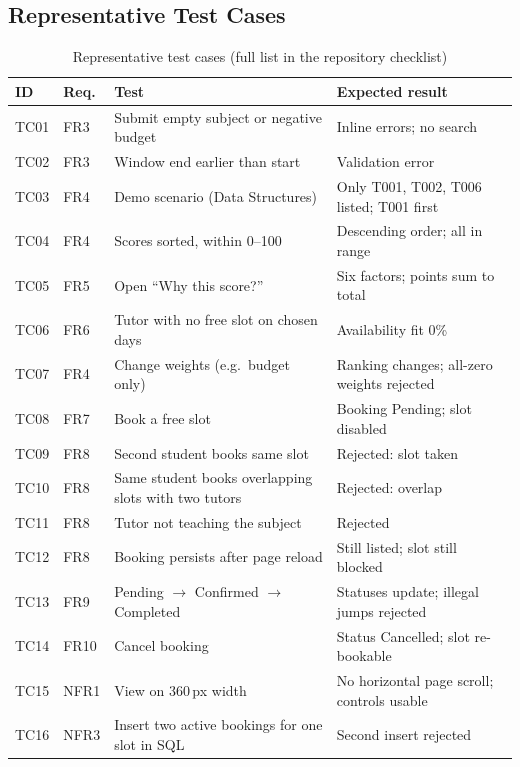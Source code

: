 \documentclass[11pt,a4paper]{article}
\begin{document}
\subsection{Representative Test Cases}
\begin{table}[H]
\centering
\caption{Representative test cases (full list in the repository checklist)}
\small
\begin{tabularx}{\linewidth}{@{}l l X X@{}}
\toprule
\textbf{ID} & \textbf{Req.} & \textbf{Test} & \textbf{Expected result}\\ \midrule
TC01 & FR3 & Submit empty subject or negative budget & Inline errors; no search\\
TC02 & FR3 & Window end earlier than start & Validation error\\
TC03 & FR4 & Demo scenario (Data Structures) & Only T001, T002, T006 listed; T001 first\\
TC04 & FR4 & Scores sorted, within 0--100 & Descending order; all in range\\
TC05 & FR5 & Open ``Why this score?'' & Six factors; points sum to total\\
TC06 & FR6 & Tutor with no free slot on chosen days & Availability fit 0\%\\
TC07 & FR4 & Change weights (e.g.\ budget only) & Ranking changes; all-zero weights rejected\\
TC08 & FR7 & Book a free slot & Booking Pending; slot disabled\\
TC09 & FR8 & Second student books same slot & Rejected: slot taken\\
TC10 & FR8 & Same student books overlapping slots with two tutors & Rejected: overlap\\
TC11 & FR8 & Tutor not teaching the subject & Rejected\\
TC12 & FR8 & Booking persists after page reload & Still listed; slot still blocked\\
TC13 & FR9 & Pending $\rightarrow$ Confirmed $\rightarrow$ Completed & Statuses update; illegal jumps rejected\\
TC14 & FR10 & Cancel booking & Status Cancelled; slot re-bookable\\
TC15 & NFR1 & View on 360\,px width & No horizontal page scroll; controls usable\\
TC16 & NFR3 & Insert two active bookings for one slot in SQL & Second insert rejected\\
\bottomrule
\end{tabularx}
\end{table}
\end{document}
